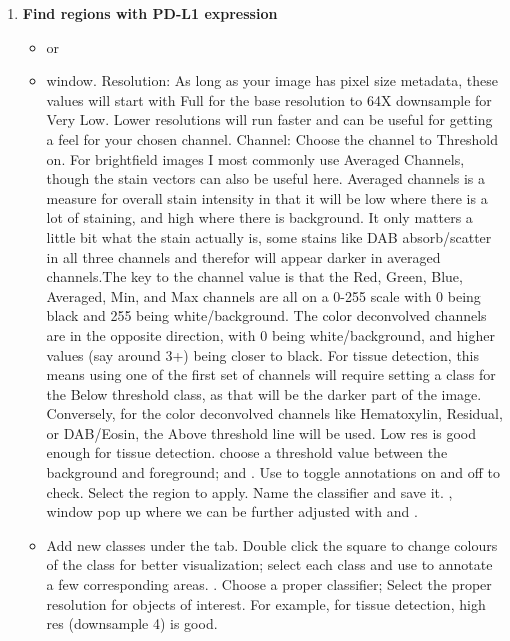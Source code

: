\documentclass[a4paper,12pt]{article}
\begin{document}
\begin{enumerate}
    \item \textbf{Find regions with PD-L1 expression} 
    \begin{itemize}
        \item \soln {} \solnend or \soln {}\solnend
        \item \soln {} \solnend window. Resolution: As long as your image has pixel size metadata, these values will start with Full for the base resolution to 64X downsample for Very Low. Lower resolutions will run faster and can be useful for getting a feel for your chosen channel. Channel: Choose the channel to Threshold on. For brightfield images I most commonly use Averaged Channels, though the stain vectors can also be useful here. Averaged channels is a measure for overall stain intensity in that it will be low where there is a lot of staining, and high where there is background. It only matters a little bit what the stain actually is, some stains like DAB absorb/scatter in all three channels and therefor will appear darker in averaged channels.The key to the channel value is that the Red, Green, Blue, Averaged, Min, and Max channels are all on a 0-255 scale with 0 being black and 255 being white/background. The color deconvolved channels are in the opposite direction, with 0 being white/background, and higher values (say around 3+) being closer to black. For tissue detection, this means using one of the first set of channels will require setting a class for the Below threshold class, as that will be the darker part of the image. Conversely, for the color deconvolved channels like Hematoxylin, Residual, or DAB/Eosin, the Above threshold line will be used. Low res is good enough for tissue detection. choose a threshold value between the background and foreground; \soln {} \solnend and \soln {} \solnend. Use \soln {} \solnend to toggle annotations on and off to check. Select the region to apply. Name the classifier and save it. \soln {} \solnend, \soln {} \solnend window pop up where we can be further adjusted with \soln {} \solnend and \soln {} \solnend.
        \item Add new classes under the \soln {} \solnend tab. Double click the square to change colours of the class for better visualization; select each class and use \soln {} \solnend to annotate a few corresponding areas. \soln {} \solnend. Choose a proper classifier; Select the proper resolution for objects of interest. For example, for tissue detection, high res (downsample 4) is good. 

\end{itemize}
\end{enumerate}
\end{document}
